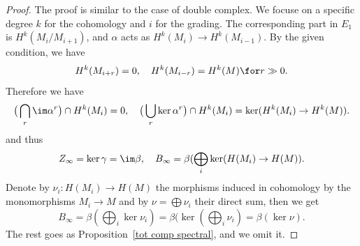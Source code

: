 \begin{proof}
The proof is similar to the case of double complex. We focuse on a specific degree $k$ for the cohomology and $i$ for the grading. The corresponding part in $E_1$ is 
$H^k(M_i/M_{i+1})$, and $\alpha$ acts as $H^k(M_i)\to H^k(M_{i-1})$. By the given condition, we have
\[H^k(M_{i+r})=0,\quad H^k(M_{i-r})=H^k(M)\for r\gg 0.\]
Therefore we have
\[\big(\bigcap_r\im\alpha^r\big)\cap H^k(M_i)=0,\quad \big(\bigcup_r\ker\alpha^r\big)\cap H^k(M_i)=\ker(H^k(M_i)\to H^k(M)).\]
and thus
\begin{align*}
Z_\infty=\ker\gamma=\im\beta,\quad B_\infty=\beta(\bigoplus_i\ker(H(M_i)\to H(M)).
\end{align*}
Denote by $\nu_i:H(M_i)\to H(M)$ the morphisms induced in cohomology by the monomorphisms $M_i\to M$ and by 
$\nu=\bigoplus\nu_i$ their direct sum, then we get
\[B_{\infty}=\beta(\bigoplus_i\ker\nu_i)=\beta(\ker(\bigoplus_i\nu_i)=\beta(\ker\nu).\]
The rest goes as Proposition~\ref{tot comp spectral}, and we omit it.
\end{proof}
